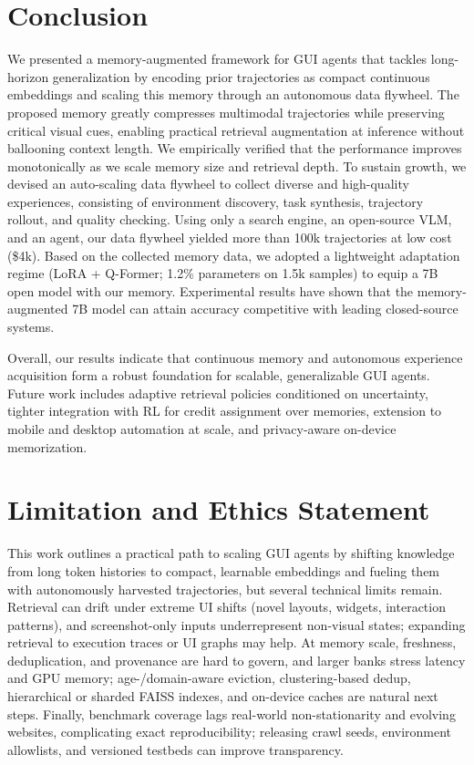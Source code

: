 \documentclass{article} %
\begin{document}
\section{Conclusion}
We presented a memory-augmented framework for GUI agents that tackles long-horizon generalization by encoding prior trajectories as compact continuous embeddings and scaling this memory through an autonomous data flywheel. 
The proposed memory greatly compresses multimodal trajectories while preserving critical visual cues, enabling practical retrieval augmentation at inference without ballooning context length. 
We empirically verified that the performance improves monotonically as we scale memory size and retrieval depth. 
To sustain growth, we devised an auto-scaling data flywheel to collect diverse and high-quality experiences, consisting of environment discovery, task synthesis, trajectory rollout, and quality checking.
Using only a search engine, an open-source VLM, and an agent, our data flywheel yielded more than 100k trajectories at low cost (\$4k). 
Based on the collected memory data, we adopted a lightweight adaptation regime (LoRA + Q-Former; 1.2\% parameters on 1.5k samples) to equip a 7B open model with our memory.
Experimental results have shown that the memory-augmented 7B model can attain accuracy competitive with leading closed-source systems.

Overall, our results indicate that continuous memory and autonomous experience acquisition form a robust foundation for scalable, generalizable GUI agents.
Future work includes adaptive retrieval policies conditioned on uncertainty, tighter integration with RL for credit assignment over memories, extension to mobile and desktop automation at scale, and privacy-aware on-device memorization. 

\section*{Limitation and Ethics Statement}
\label{sec:ethics}
This work outlines a practical path to scaling GUI agents by shifting knowledge from long token histories to compact, learnable embeddings and fueling them with autonomously harvested trajectories, but several technical limits remain. Retrieval can drift under extreme UI shifts (novel layouts, widgets, interaction patterns), and screenshot-only inputs underrepresent non-visual states; expanding retrieval to execution traces or UI graphs may help. At memory scale, freshness, deduplication, and provenance are hard to govern, and larger banks stress latency and GPU memory; age-/domain-aware eviction, clustering-based dedup, hierarchical or sharded FAISS indexes, and on-device caches are natural next steps. Finally, benchmark coverage lags real-world non-stationarity and evolving websites, complicating exact reproducibility; releasing crawl seeds, environment allowlists, and versioned testbeds can improve transparency.
\end{document}
